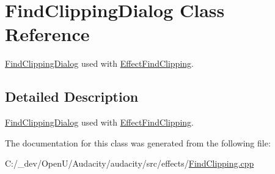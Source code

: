\hypertarget{class_find_clipping_dialog}{}\section{Find\+Clipping\+Dialog Class Reference}
\label{class_find_clipping_dialog}


\hyperlink{class_find_clipping_dialog}{Find\+Clipping\+Dialog} used with \hyperlink{class_effect_find_clipping}{Effect\+Find\+Clipping}.  




\subsection{Detailed Description}
\hyperlink{class_find_clipping_dialog}{Find\+Clipping\+Dialog} used with \hyperlink{class_effect_find_clipping}{Effect\+Find\+Clipping}. 

The documentation for this class was generated from the following file\+:\begin{DoxyCompactItemize}
\item 
C\+:/\+\_\+dev/\+Open\+U/\+Audacity/audacity/src/effects/\hyperlink{_find_clipping_8cpp}{Find\+Clipping.\+cpp}\end{DoxyCompactItemize}
